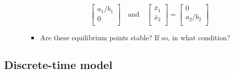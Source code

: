 \documentclass[12pt,a4paper]{article}
\begin{document}
\begin{itemize}
\begin{itemize}
\begin{itemize}
\begin{equation}
\begin{bmatrix}
          a_{1}/b_{1} \\
          0 \\
        \end{bmatrix}
        \quad\text{and}\quad
        \begin{bmatrix}
          \bar{x}_{1} \\
          \bar{x}_{2} \\
        \end{bmatrix}
        = 
        \begin{bmatrix}
          0 \\
          a_{2}/b_{2} \\
        \end{bmatrix}
      \end{equation}
    \item Are these equilibrium points stable? If so, in what condition?
    \end{itemize}
  \end{itemize}

\end{itemize}

\subsection{Discrete-time model}
\end{document}
